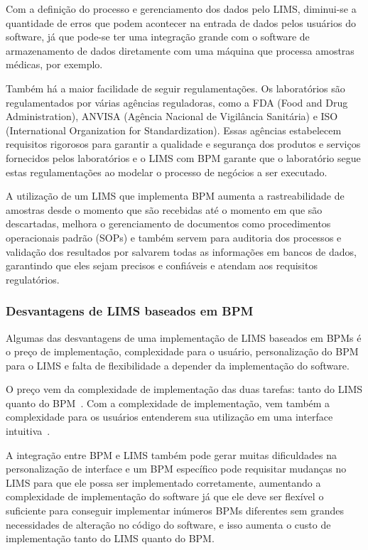 Com a definição do processo e gerenciamento dos dados pelo LIMS, diminui-se a quantidade de erros que podem acontecer na entrada de dados pelos usuários do software, já que pode-se ter uma integração grande com o software de armazenamento de dados diretamente com uma máquina que processa amostras médicas, por exemplo.

Também há a maior facilidade de seguir regulamentações. Os laboratórios são regulamentados por várias agências reguladoras, como a FDA (Food and Drug Administration), ANVISA (Agência Nacional de Vigilância Sanitária) e ISO (International Organization for Standardization). Essas agências estabelecem requisitos rigorosos para garantir a qualidade e segurança dos produtos e serviços fornecidos pelos laboratórios e o LIMS com BPM garante que o laboratório segue estas regulamentações ao modelar o processo de negócios a ser executado.

A utilização de um LIMS que implementa BPM aumenta a rastreabilidade de amostras desde o momento que são recebidas até o momento em que são descartadas, melhora o gerenciamento de documentos como procedimentos operacionais padrão (SOPs) e também servem para auditoria dos processos e validação dos resultados por salvarem todas as informações em bancos de dados, garantindo que eles sejam precisos e confiáveis e atendam aos requisitos regulatórios.


\subsubsection{Desvantagens de LIMS baseados em BPM}

Algumas das desvantagens de uma implementação de LIMS baseados em BPMs é o preço de implementação, complexidade para o usuário, personalização do BPM para o LIMS e falta de flexibilidade a depender da implementação do software.

O preço vem da complexidade de implementação das duas tarefas: tanto do LIMS quanto do BPM~\cite{Mutschler2013UnderstandingTechnology}. Com a complexidade de implementação, vem também a complexidade para os usuários entenderem sua utilização em uma interface intuitiva~\cite{Cardoso2006AModels}.

A integração entre BPM e LIMS também pode gerar muitas dificuldades na personalização de interface e um BPM específico pode requisitar mudanças no LIMS para que ele possa ser implementado corretamente, aumentando a complexidade de implementação do software já que ele deve ser flexível o suficiente para conseguir implementar inúmeros BPMs diferentes sem grandes necessidades de alteração no código do software, e isso aumenta o custo de implementação tanto do LIMS quanto do BPM.
